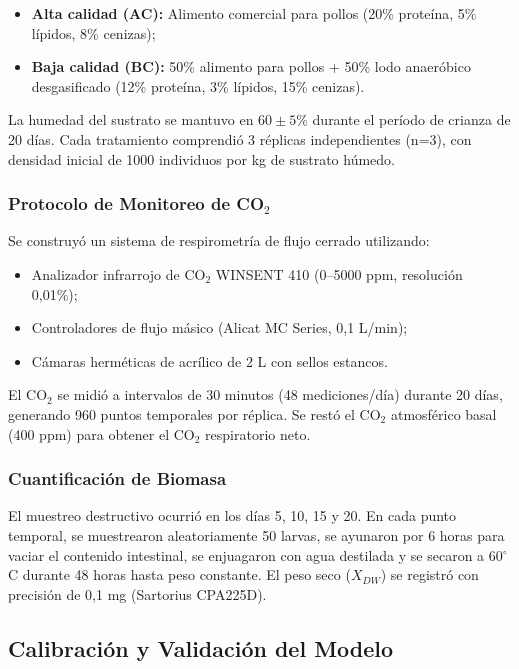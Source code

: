 \documentclass[12pt,a4paper]{article}
\begin{document}
\begin{itemize}
    \item \textbf{Alta calidad (AC):} Alimento comercial para pollos (20\% prote\'{i}na, 5\% l\'{i}pidos, 8\% cenizas);
    \item \textbf{Baja calidad (BC):} 50\% alimento para pollos + 50\% lodo anaer\'{o}bico desgasificado (12\% prote\'{i}na, 3\% l\'{i}pidos, 15\% cenizas).
\end{itemize}

La humedad del sustrato se mantuvo en $60 \pm 5$\% durante el per\'{i}odo de crianza de 20 d\'{i}as. Cada tratamiento comprendi\'{o} 3 r\'{e}plicas independientes (n=3), con densidad inicial de 1000 individuos por kg de sustrato h\'{u}medo.

\subsubsection{Protocolo de Monitoreo de CO$_2$}

Se construy\'{o} un sistema de respirometr\'{i}a de flujo cerrado utilizando:
\begin{itemize}
    \item Analizador infrarrojo de CO$_2$ WINSENT 410 (0--5000 ppm, resoluci\'{o}n 0,01\%);
    \item Controladores de flujo m\'{a}sico (Alicat MC Series, 0,1 L/min);
    \item C\'{a}maras herm\'{e}ticas de acr\'{i}lico de 2 L con sellos estancos.
\end{itemize}

El CO$_2$ se midi\'{o} a intervalos de 30 minutos (48 mediciones/d\'{i}a) durante 20 d\'{i}as, generando 960 puntos temporales por r\'{e}plica. Se rest\'{o} el CO$_2$ atmosf\'{e}rico basal (400 ppm) para obtener el CO$_2$ respiratorio neto.

\subsubsection{Cuantificaci\'{o}n de Biomasa}

El muestreo destructivo ocurri\'{o} en los d\'{i}as 5, 10, 15 y 20. En cada punto temporal, se muestrearon aleatoriamente 50 larvas, se ayunaron por 6 horas para vaciar el contenido intestinal, se enjuagaron con agua destilada y se secaron a 60$^{\circ}$C durante 48 horas hasta peso constante. El peso seco ($X_{DW}$) se registr\'{o} con precisi\'{o}n de 0,1 mg (Sartorius CPA225D).

\subsection{Calibraci\'{o}n y Validaci\'{o}n del Modelo}
\end{document}
